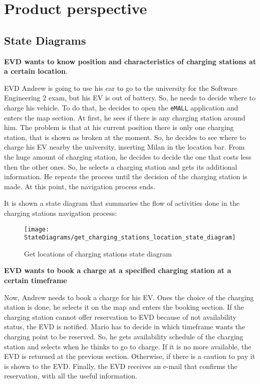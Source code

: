 \section{Product perspective}\label{sec:product_perspective}
\subsection{State Diagrams}\label{subsec:state-diagrams}
\textbf{EVD wants to know position and characteristics of charging stations at a certain location}.

EVD Andrew is going to use his car to go to the university for the Software Engineering 2 exam, but his EV is out of battery.
So, he needs to decide where to charge his vehicle.
To do that, he decides to open the \verb|eMALL| application and enters the map section.
At first, he sees if there is any charging station around him.
The problem is that at his current position there is only one charging station, that is shown as broken at the moment.
So, he decides to see where to charge his EV nearby the university, inserting Milan in the location bar.
From the huge amount of charging station, he decides to decide the one that costs less then the other ones.
So, he selects a charging station and gets its additional information.
He repeats the process until the decision of the charging station is made.
At this point, the navigation process ends.

It is shown a state diagram that summaries the flow of activities done in the charging stations navigation process:
\begin{figure}[H]
    \centering
    \texttt{[image: StateDiagrams/get\_charging\_stations\_location\_state\_diagram]}
    \caption{Get locations of charging stations state diagram}
    \label{fig: locations_sd}
\end{figure}

\textbf{EVD wants to book a charge at a specified charging station at a certain timeframe}

Now, Andrew needs to book a charge for his EV. Ones the choice of the charging station is done, he selects it on the map
and enters the booking section.
If the charging station cannot offer reservation to EVD because of not availability status, the EVD is notified.
Mario has to decide in which timeframe wants the charging point to be reserved.
So, he gets availability schedule of the charging station and selects when he thinks to go to charge.
If it is no more available, the EVD is returned at the previous section.
Otherwise, if there is a caution to pay it is shown to the EVD.
Finally, the EVD receives an e-mail that confirms the reservation, with all the useful information.

